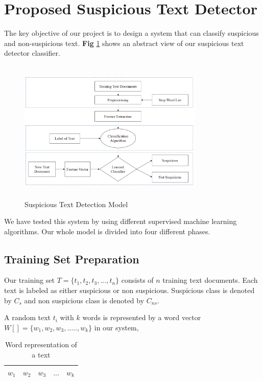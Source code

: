 \section{\textbf{Proposed Suspicious Text Detector}}
The key objective of our project is to design a system that can classify suspicious and non-suspicious text. \textbf{Fig} \ref{fig:proposed_model} shows an abstract view of our suspicious text detector classifier.

\begin{figure}[h!]
\centering
  \includegraphics[height=6.8cm, width=8.8cm]{Figures/pr_model.PNG}
  \caption{ Suspicious Text Detection Model}
  \label{fig:proposed_model}
\end{figure}

We have tested this system by using different supervised machine learning algorithms. Our whole model is divided into four different phases.
\subsection{\textbf {Training Set Preparation}}
Our training set $T = \{t_1, t_2, t_3, ..., t_n\}$ consists of $n$ training text documents. Each text is labeled as either suspicious or non suspicious. Suspicious class is denoted by $C_s$ and non suspicious class is denoted by $C_{ns}$.\par
A random text $t_i$ with $k$ words is represented by a word vector $W[] =\{w_1, w_2, w_3, ....., w_k\}$ in our system,
\begin{table}[h!]
\begin{center}
\caption{Word representation of a text}
\begin{tabular}{|m{1cm} | m{1cm}| m{1cm}|m{1cm} | m{1cm}|}
\hline
     $w_1$ & $w_2$  & $w_3$ & $...$ & $w_k$  \\
\hline
\end{tabular}
\end{center}
\end{table}

